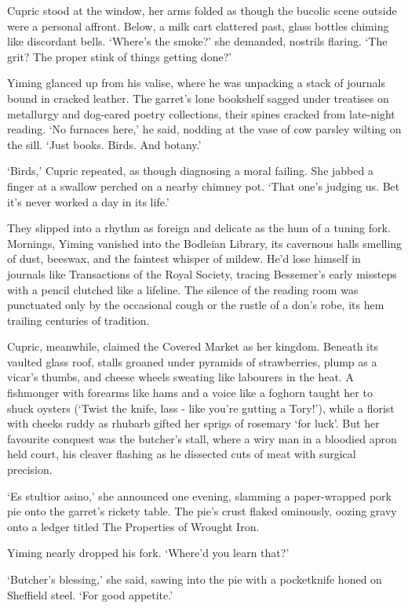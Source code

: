 Cupric stood at the window, her arms folded as though the bucolic scene outside were a personal affront. Below, a milk cart clattered past, glass bottles chiming like discordant bells. `Where's the smoke?' she demanded, nostrils flaring. `The grit? The proper stink of things getting done?'

Yiming glanced up from his valise, where he was unpacking a stack of journals bound in cracked leather. The garret's lone bookshelf sagged under treatises on metallurgy and dog-eared poetry collections, their spines cracked from late-night reading. `No furnaces here,' he said, nodding at the vase of cow parsley wilting on the sill. `Just books. Birds. And botany.'

`Birds,' Cupric repeated, as though diagnosing a moral failing. She jabbed a finger at a swallow perched on a nearby chimney pot. `That one's judging us. Bet it's never worked a day in its life.'

They slipped into a rhythm as foreign and delicate as the hum of a tuning fork. Mornings, Yiming vanished into the Bodleian Library, its cavernous halls smelling of dust, beeswax, and the faintest whisper of mildew. He'd lose himself in journals like Transactions of the Royal Society, tracing Bessemer's early missteps with a pencil clutched like a lifeline. The silence of the reading room was punctuated only by the occasional cough or the rustle of a don's robe, its hem trailing centuries of tradition.

Cupric, meanwhile, claimed the Covered Market as her kingdom. Beneath its vaulted glass roof, stalls groaned under pyramids of strawberries, plump as a vicar's thumbs, and cheese wheels sweating like labourers in the heat. A fishmonger with forearms like hams and a voice like a foghorn taught her to shuck oysters (`Twist the knife, lass - like you're gutting a Tory!'), while a florist with cheeks ruddy as rhubarb gifted her sprigs of rosemary `for luck'. But her favourite conquest was the butcher's stall, where a wiry man in a bloodied apron held court, his cleaver flashing as he dissected cuts of meat with surgical precision.

`Es stultior asino,' she announced one evening, slamming a paper-wrapped pork pie onto the garret's rickety table. The pie's crust flaked ominously, oozing gravy onto a ledger titled The Properties of Wrought Iron.

Yiming nearly dropped his fork. `Where'd you learn that?'

`Butcher's blessing,' she said, sawing into the pie with a pocketknife honed on Sheffield steel. `For good appetite.'

